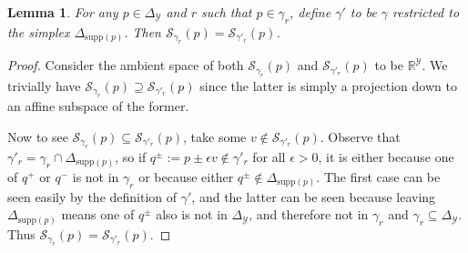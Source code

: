 \documentclass{article}
\newcommand{\Comments}{1}
\newcommand{\mytodo}[2]{\ifnum\Comments=1%
	\todo[linecolor=#1!80!black,backgroundcolor=#1,bordercolor=#1!80!black]{#2}\fi}
\newcommand{\jessiet}[1]{\mytodo{purple!20!white}{JF: #1}}
\newcommand{\reals}{\mathbb{R}}
\newcommand{\simplex}{\Delta_\Y}
\newcommand{\supp}{\mathrm{supp}}
\newcommand{\spn}{\mathrm{span}}
\renewcommand{\S}{\mathcal{S}}
\newcommand{\Y}{\mathcal{Y}}
\newtheorem{lemma}{Lemma}
\begin{document}
\begin{lemma}\label{lem:p-boundary-fsd}
	For any $p \in \simplex$ and $r$ such that $p \in \gamma_r$, define $\gamma'$ to be $\gamma$ restricted to the simplex $\Delta_{\supp(p)}$.
	Then $\S_{\gamma_r}(p) = \S_{\gamma'_r}(p)$.
\end{lemma}
\begin{proof}
	Consider the ambient space of both $\S_{\gamma_r}(p)$ and $\S_{\gamma'_r}(p)$ to be $\reals^\Y$.
	We trivially have $\S_{\gamma_r}(p) \supseteq \S_{\gamma'_r}(p)$ since the latter is simply a projection down to an affine subspace of the former.
	
	Now to see $\S_{\gamma_r}(p) \subseteq \S_{\gamma'_r}(p)$, take some $v \not \in \S_{\gamma'_r}(p)$.
	Observe that $\gamma'_r = \gamma_r \cap \Delta_{\supp(p)}$, so if $q^\pm := p \pm \epsilon v \not \in \gamma'_r$ for all $\epsilon > 0$, it is either because one of $q^+$ or $q^-$ is not in $\gamma_r$ or because either $q^\pm \not \in \Delta_{\supp(p)}$.
	The first case can be seen easily by the definition of $\gamma'$, and the latter can be seen because leaving $\Delta_{\supp(p)}$ means one of $q^\pm$ also is not in $\simplex$, and therefore not in $\gamma_r$ and $\gamma_r \subseteq \simplex$.
	Thus $\S_{\gamma_r}(p) = \S_{\gamma'_r}(p)$.
%	
\end{proof}
\end{document}
